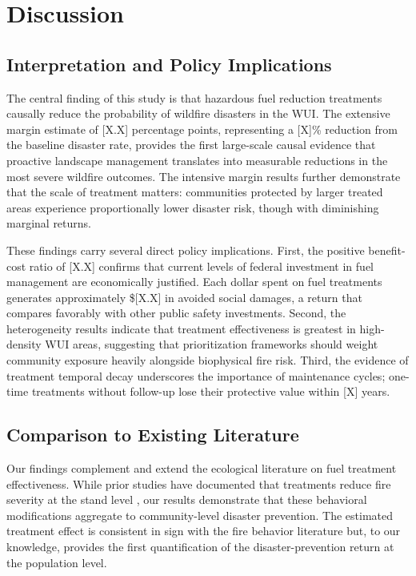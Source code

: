 \documentclass[12pt, letterpaper]{article}
\begin{document}
\section{Discussion}

\subsection{Interpretation and Policy Implications}

The central finding of this study is that hazardous fuel reduction treatments causally reduce the probability of wildfire disasters in the WUI. The extensive margin estimate of [X.X] percentage points, representing a [X]\% reduction from the baseline disaster rate, provides the first large-scale causal evidence that proactive landscape management translates into measurable reductions in the most severe wildfire outcomes. The intensive margin results further demonstrate that the scale of treatment matters: communities protected by larger treated areas experience proportionally lower disaster risk, though with diminishing marginal returns.

These findings carry several direct policy implications. First, the positive benefit-cost ratio of [X.X] confirms that current levels of federal investment in fuel management are economically justified. Each dollar spent on fuel treatments generates approximately \$[X.X] in avoided social damages, a return that compares favorably with other public safety investments. Second, the heterogeneity results indicate that treatment effectiveness is greatest in high-density WUI areas, suggesting that prioritization frameworks should weight community exposure heavily alongside biophysical fire risk. Third, the evidence of treatment temporal decay underscores the importance of maintenance cycles; one-time treatments without follow-up lose their protective value within [X] years.

\subsection{Comparison to Existing Literature}

Our findings complement and extend the ecological literature on fuel treatment effectiveness. While prior studies have documented that treatments reduce fire severity at the stand level \citep{agee2005, stephens2012}, our results demonstrate that these behavioral modifications aggregate to community-level disaster prevention. The estimated treatment effect is consistent in sign with the fire behavior literature but, to our knowledge, provides the first quantification of the disaster-prevention return at the population level.
\end{document}
